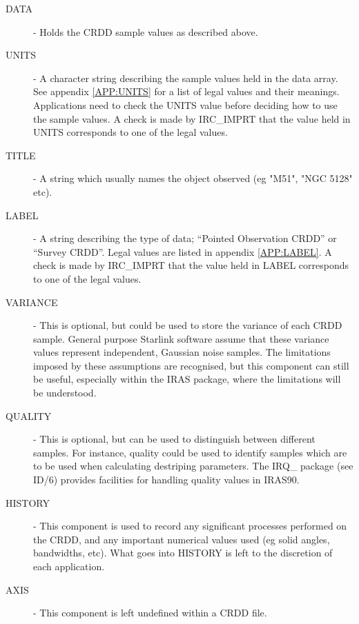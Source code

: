 \begin{description}

\item [DATA] - Holds the CRDD sample values as described above.

\item [UNITS] - A character string describing the sample values held in the data
array. See appendix \ref {APP:UNITS} for a list of legal values and their
meanings. Applications need to check the UNITS value before deciding how to use
the sample values. A check is made by IRC\_IMPRT that the value held in UNITS
corresponds to one of the legal values.

\item [TITLE] - A string which usually names the object observed (eg "M51",
"NGC 5128" etc).

\item [LABEL] - A string describing the type of data; ``Pointed Observation
CRDD'' or ``Survey CRDD''. Legal values are listed in appendix \ref{APP:LABEL}.
A check is made by IRC\_IMPRT that the value held in LABEL corresponds to one of
the legal values.

\item [VARIANCE] - This is optional, but could be used to store the variance of
each CRDD sample. General purpose Starlink software assume that these variance
values represent independent, Gaussian noise samples. The limitations imposed
by these assumptions are recognised, but this component can still be useful,
especially within the IRAS package, where the limitations will be understood.

\item [QUALITY] - This is optional, but can be used to distinguish between
different samples. For instance, quality could be used to identify samples
which are to be used when calculating destriping parameters. The IRQ\_ package
(see ID/6) provides facilities for handling quality values in IRAS90.

\item [HISTORY] - This component is used to record any significant processes
performed on the CRDD, and any important numerical values used (eg solid angles,
bandwidths, etc). What goes into HISTORY is left to the discretion of each
application.

\item [AXIS] - This component is left undefined within a CRDD file.

\end{description}

